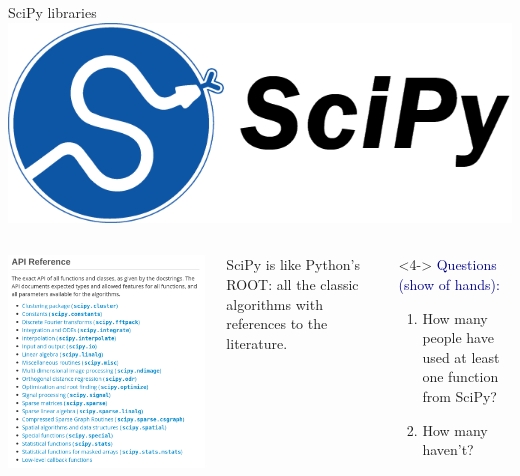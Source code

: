 \documentclass[aspectratio=169]{beamer}
\begin{document}
\begin{frame}{SciPy libraries}
\vspace{0.35 cm}
\hfill \includegraphics[height=1 cm]{scipy-logo.png}

\vspace{-1 cm}
\begin{columns}[b]
\includegraphics[width=\linewidth]{scipy-docs.png}

SciPy is like Python's ROOT: all the classic algorithms with references to the literature.

\vspace{0.2 cm}

\vspace{0.2 cm}

\vspace{0.5 cm}
\begin{uncoverenv}<4->
\small
\textcolor{darkblue}{Questions (show of hands):}
\vspace{-0.2 cm}
\begin{enumerate}\setlength{\itemsep}{-0.1 cm}
\item How many people have used at least one function from SciPy?
\item How many haven't?
\end{enumerate}
\end{uncoverenv}
\vspace{0.05 cm}
\end{columns}
\end{frame}
\end{document}

